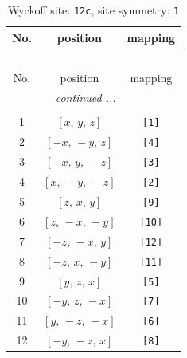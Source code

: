 \documentclass[fleqn,8pt]{jsarticle}
\begin{document}
\begin{longtable}{ccc}
\caption{Wyckoff site: {\tt 12c}, site symmetry: {\tt 1}}
 \\
 \hline \hline
No. & position & mapping \\ \hline \endfirsthead

\multicolumn{2}{l}{\tablename\ \thetable{}} \\
 \hline \hline
No. & position & mapping \\ \hline \endhead

 \hline \hline
\multicolumn{2}{r}{\footnotesize\it continued ...} \\ \endfoot

 \hline \hline
\multicolumn{2}{r}{} \\ \endlastfoot

1 & $\left[ x,\, y,\, z \right]$ & {\tt [1]} \\ \hline
2 & $\left[ - x,\, - y,\, z \right]$ & {\tt [4]} \\ \hline
3 & $\left[ - x,\, y,\, - z \right]$ & {\tt [3]} \\ \hline
4 & $\left[ x,\, - y,\, - z \right]$ & {\tt [2]} \\ \hline
5 & $\left[ z,\, x,\, y \right]$ & {\tt [9]} \\ \hline
6 & $\left[ z,\, - x,\, - y \right]$ & {\tt [10]} \\ \hline
7 & $\left[ - z,\, - x,\, y \right]$ & {\tt [12]} \\ \hline
8 & $\left[ - z,\, x,\, - y \right]$ & {\tt [11]} \\ \hline
9 & $\left[ y,\, z,\, x \right]$ & {\tt [5]} \\ \hline
10 & $\left[ - y,\, z,\, - x \right]$ & {\tt [7]} \\ \hline
11 & $\left[ y,\, - z,\, - x \right]$ & {\tt [6]} \\ \hline
12 & $\left[ - y,\, - z,\, x \right]$ & {\tt [8]} \\
\end{longtable}
\end{document}
